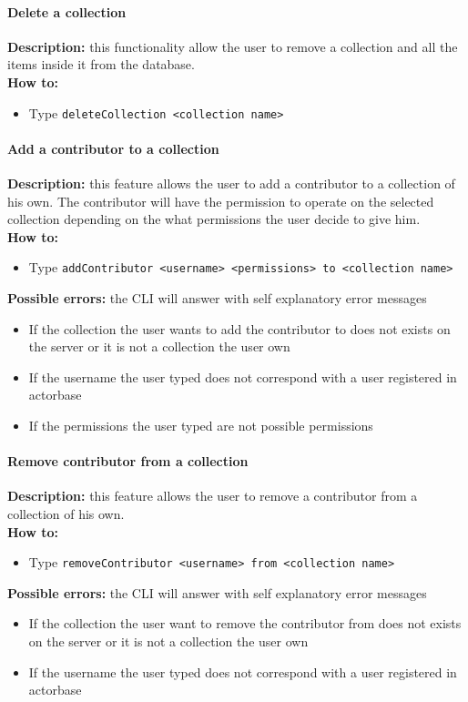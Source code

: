 \documentclass{scalatekids-article}
\begin{document}
\paragraph{Delete a collection}
\label{sec:deletecollection}
\textbf{Description:} this functionality allow the user to remove a collection and all the items inside it from the database.\\
\textbf{How to:} 
\begin{itemize}
	\item Type \texttt{deleteCollection <collection name>}
\end{itemize}

\paragraph{Add a contributor to a collection}
\label{sec:addcontributor}
\textbf{Description:} this feature allows the user to add a contributor 
to a collection of his own. The contributor will have the permission to operate on the selected collection depending on the what permissions the user decide to give him.\\
\textbf{How to:} 
\begin{itemize}
	\item Type \texttt{addContributor <username> <permissions> to <collection name>}
\end{itemize}
\textbf{Possible errors:} the CLI will answer with self explanatory error messages 
\begin{itemize}
	\item If the collection the user wants to add the contributor to does not exists on the server or it is not a collection the user own
	\item If the username the user typed does not correspond with a user registered in actorbase
	\item If the permissions the user typed are not possible permissions
\end{itemize}

\paragraph{Remove contributor from a collection}
\label{sec:removecontributor}
\textbf{Description:} this feature allows the user to remove a contributor from a collection of his own.\\
\textbf{How to:} 
\begin{itemize}
	\item Type \texttt{removeContributor <username> from <collection name>}
\end{itemize}
\textbf{Possible errors:} the CLI will answer with self explanatory error messages 
\begin{itemize}
	\item If the collection the user want to remove the contributor from does not exists on the server or it is not a collection the user own
	\item If the username the user typed does not correspond with a user registered in actorbase
\end{itemize}
\end{document}
